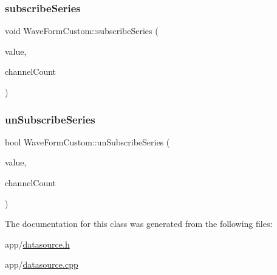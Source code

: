 \subsubsection{\texorpdfstring{subscribe\+Series}{subscribeSeries}}
{\footnotesize\ttfamily void Wave\+Form\+Custom\+::subscribe\+Series (\begin{DoxyParamCaption}\item[{Q\+Abstract\+Series $\ast$}]{value,  }\item[{int}]{channel\+Count }\end{DoxyParamCaption})\hspace{0.3cm}{\ttfamily [slot]}}

\hypertarget{class_wave_form_custom_a51bbb3f0a646f2fbac70617cad686d75}{}\label{class_wave_form_custom_a51bbb3f0a646f2fbac70617cad686d75} 
\subsubsection{\texorpdfstring{un\+Subscribe\+Series}{unSubscribeSeries}}
{\footnotesize\ttfamily bool Wave\+Form\+Custom\+::un\+Subscribe\+Series (\begin{DoxyParamCaption}\item[{Q\+Abstract\+Series $\ast$}]{value,  }\item[{int}]{channel\+Count }\end{DoxyParamCaption})\hspace{0.3cm}{\ttfamily [slot]}}



The documentation for this class was generated from the following files\+:\begin{DoxyCompactItemize}
\item 
app/\hyperlink{datasource_8h}{datasource.\+h}\item 
app/\hyperlink{datasource_8cpp}{datasource.\+cpp}\end{DoxyCompactItemize}
